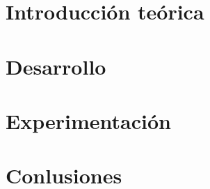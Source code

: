 \documentclass[12pt, a4paper]{report}
\begin{document}


\tableofcontents{}

\chapter{Introducción teórica} 


\chapter{Desarrollo}


\chapter{Experimentación}


\chapter{Conlusiones}

\end{document}
